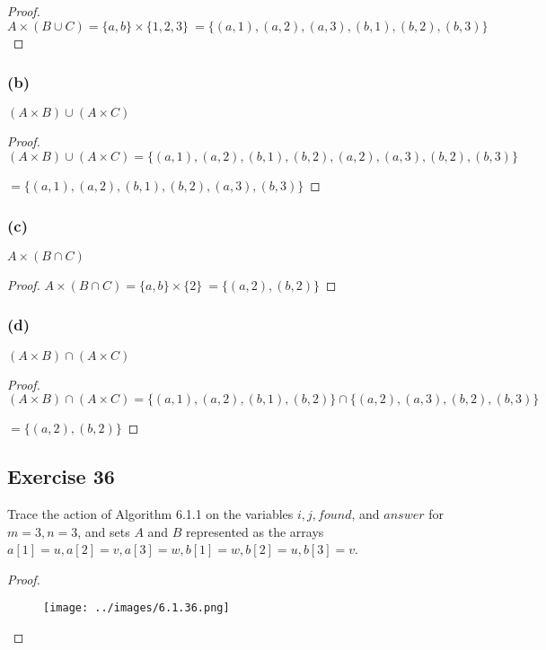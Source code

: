 \documentclass[14pt]{extarticle}
\begin{document}
\begin{proof}
  \(A \times (B \cup C) = \{a, b\} \times \{1, 2, 3\}\ = \{(a, 1), (a, 2), (a, 3), (b, 1), (b, 2), (b, 3)\}\)
\end{proof}

\subsubsection{(b)}
$(A \times B) \cup (A \times C)$

\begin{proof}
  \((A \times B) \cup (A \times C) = \{(a, 1), (a, 2), (b, 1), (b, 2), (a, 2), (a, 3), (b, 2), (b, 3)\}\)

  \(= \{(a, 1), (a, 2), (b, 1), (b, 2), (a, 3), (b, 3)\}\)
\end{proof}

\subsubsection{(c)}
$A \times (B \cap C)$

\begin{proof}
  \(A \times (B \cap C) = \{a, b\} \times \{2\}\ = \{(a, 2), (b, 2)\}\)
\end{proof}

\subsubsection{(d)}
$(A \times B) \cap (A \times C)$

\begin{proof}
  \((A \times B) \cap (A \times C) = \{(a, 1), (a, 2), (b, 1), (b, 2)\} \cap \{(a, 2), (a, 3), (b, 2), (b, 3)\}\)

  \(= \{(a, 2), (b, 2)\}\)
\end{proof}

\subsection{Exercise 36}
Trace the action of Algorithm 6.1.1 on the variables $i, j, found$, and $answer$ for $m = 3, n = 3$, and sets $A$ and
$B$ represented as the arrays \(a[1] = u, a[2] = v, a[3] = w, b[1] = w, b[2] = u, b[3] = v\).

\begin{proof}
  \begin{figure}[ht!]
    \centering
    \texttt{[image: ../images/6.1.36.png]}
  \end{figure}
\end{proof}
\end{document}
